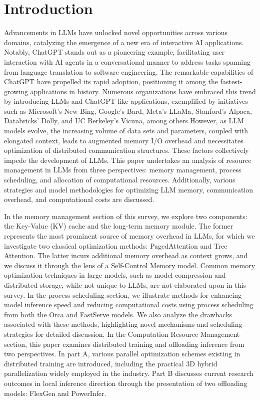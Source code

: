 \documentclass[conference]{IEEEtran}
\begin{document}
\section{Introduction}
Advancements in LLMs have unlocked novel opportunities across various domains, catalyzing the emergence of a new era of interactive AI applications. Notably, ChatGPT stands out as a pioneering example, facilitating user interaction with AI agents in a conversational manner to address tasks spanning from language translation to software engineering. The remarkable capabilities of ChatGPT have propelled its rapid adoption, positioning it among the fastest-growing applications in history. Numerous organizations have embraced this trend by introducing LLMs and ChatGPT-like applications, exemplified by initiatives such as Microsoft's New Bing, Google's Bard, Meta's LLaMa, Stanford's Alpaca, Databricks' Dolly, and UC Berkeley's Vicuna, among others.However, as LLM models evolve, the increasing volume of data sets and parameters, coupled with elongated context, leads to augmented memory I/O overhead and necessitates optimization of distributed communication structures. These factors collectively impede the development of LLMs. This paper undertakes an analysis of resource management in LLMs from three perspectives: memory management, process scheduling, and allocation of computational resources. Additionally, various strategies and model methodologies for optimizing LLM memory, communication overhead, and computational costs are discussed.

In the memory management section of this survey, we explore two components: the Key-Value (KV) cache and the long-term memory module. The former represents the most prominent source of memory overhead in LLMs, for which we investigate two classical optimization methods: PagedAttention and Tree Attention. The latter incurs additional memory overhead as context grows, and we discuss it through the lens of a Self-Control Memory model. Common memory optimization techniques in large models, such as model compression and distributed storage, while not unique to LLMs, are not elaborated upon in this survey.
In the process scheduling section, we illustrate methods for enhancing model inference speed and reducing computational costs using process scheduling from both the Orca and FastServe models. We also analyze the drawbacks associated with these methods, highlighting novel mechanisms and scheduling strategies for detailed discussion.
In the Computation Resource Management section, this paper examines distributed training and offloading inference from two perspectives. In part A, various parallel optimization schemes existing in distributed training are introduced, including the practical 3D hybrid parallelization widely employed in the industry. Part B discusses current research outcomes in local inference direction through the presentation of two offloading models: FlexGen and PowerInfer.
\end{document}
